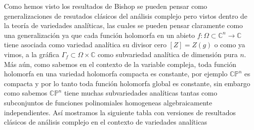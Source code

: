 \documentclass[letterpaper]{report}
\newcommand{\co}{\ensuremath{\mathbb C }}
\newcommand{\con}{\ensuremath{\mathbb{C}^n}}
\newcommand{\cp}{\ensuremath{\mathbb{CP}}}
\begin{document}
Como hemos visto los resultados de Bishop se pueden pensar como generalizaciones de resutados cl\'asicos del an\'alisis complejo
pero vistos dentro de la teor\'ia de variedades anal\'iticas, las cuales se pueden pensar claramente como una generalizaci\'on 
ya que cada funci\'on holomorfa en un abieto $f:\Omega\subset\con\rightarrow\co$ tiene asociada como variedad anal\'itica su divisor cero $[Z]=Z(g)$
o como ya vimos, a la gr\'afica $\Gamma_{f}\subset\Omega\times\co$ como subvariedad anal\'itica de dimensi\'on pura $n$. M\'as a\'un, como sabemos en el contexto
de la variable compleja, toda funci\'on holomorfa en una variedad holomorfa compacta es constante, por ejemplo $\cp^n$ es compacta
y por lo tanto toda funci\'on holomorfa global es constante, sin embargo como sabemos $\cp^n$ tiene muchas subvariedades anal\'iticas
tantas como subconjuntos de funciones polinomiales homogeneas algebraicamente independientes. As\'i mostramos la siguiente tabla con
versiones de resultados cl\'asicos de an\'alisis complejo en el contexto de variedades anal\'iticas 
\\      
\label{table_complex_analysis} 
\end{document}
